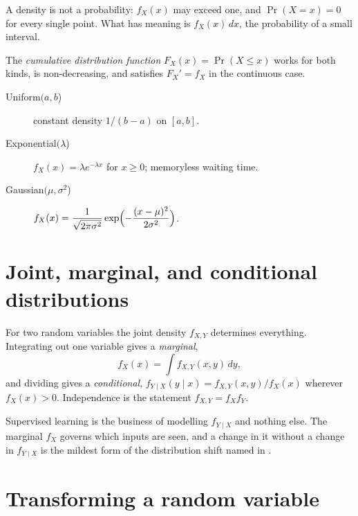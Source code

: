 A density is not a probability: \(f_X(x)\) may exceed one, and
\(\Pr(X=x)=0\) for every single point. What has meaning is \(f_X(x)\,dx\), the
probability of a small interval.

The \emph{cumulative distribution function} \(F_X(x)=\Pr(X\le x)\) works for both
kinds, is non-decreasing, and satisfies \(F_X'=f_X\) in the continuous case.

\begin{description}
	\item[Uniform\((a,b\))] constant density \(1/(b-a)\) on \([a,b]\).
	\item[Exponential\((\lambda\))] \(f_X(x)=\lambda e^{-\lambda x}\) for
	\(x\ge0\); memoryless waiting time.
	\item[Gaussian\((\mu,\sigma^{2}\))]
	\(f_X(x)=\dfrac{1}{\sqrt{2\pi\sigma^{2}}}\exp\Bigl(-\dfrac{(x-\mu)^{2}}{2\sigma^{2}}\Bigr)\).
\end{description}


\section{Joint, marginal, and conditional distributions}

For two random variables the joint density \(f_{X,Y}\) determines everything.
Integrating out one variable gives a \emph{marginal},
\[
	f_X(x)=\int f_{X,Y}(x,y)\,dy,
\]
and dividing gives a \emph{conditional},
\(f_{Y\mid X}(y\mid x)=f_{X,Y}(x,y)/f_X(x)\) wherever \(f_X(x)>0\). Independence
is the statement \(f_{X,Y}=f_Xf_Y\).

\begin{remark}
Supervised learning is the business of modelling \(f_{Y\mid X}\) and nothing
else. The marginal \(f_X\) governs which inputs are seen, and a change in it
without a change in \(f_{Y\mid X}\) is the mildest form of the distribution shift
named in .
\end{remark}

\section{Transforming a random variable}

